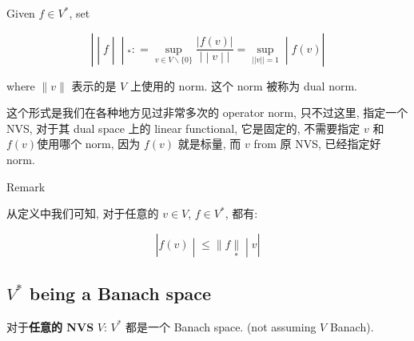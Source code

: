 \begin{definition}{}

Given \(f \in V^{\ast}\), set

\[\left. | \middle| f \middle| \middle| {}_{\ast}: = \sup\limits_{v \in V\backslash{\{ 0\}}}\frac{|f(v)|}{\left. | \middle| v \middle| | \right.} = \sup\limits_{||v|| = 1} \middle| f(v)| \right.\]

where \(\parallel v \parallel\) 表示的是 \(V\) 上使用的 norm. 这个 norm 被称为 dual norm.

\end{definition}

这个形式是我们在各种地方见过非常多次的{ }\textbf{} operator norm, 只不过这里, 指定一个 NVS, 对于其 dual space 上的 linear functional, 它是固定的, 不需要指定 \(v\) 和 \(f(v)\)使用哪个 norm, 因为 \(f(v)\) 就是标量, 而 \(v\) from 原 NVS, 已经指定好 norm.

\begin{qlremark}{Remark}

从定义中我们可知, 对于任意的 \(v \in V\), \(f \in V^{\ast}\), 都有:

\[\left. |f(v) \middle| \leq \parallel f\underset{\ast}{\parallel} \middle| v| \right.\]

\end{qlremark}

\subsection{\texorpdfstring{\(V^{\ast}\) being a Banach space}{V\^{}\{\textbackslash ast\} being a Banach space}}

\begin{theorem}{}

对于\textbf{任意的 NVS} \(V\): \(V^{\ast}\) 都是一个 Banach space. (not assuming \(V\) Banach).

\end{theorem}

